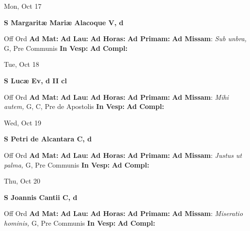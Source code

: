 \documentclass[10pt]{article}
\begin{document}
\begin{minipage}{3.5in}
\vspace{2em}\begin{center}
Mon, Oct 17
\end{center}\textbf{ \large S Margaritæ Mariæ Alacoque V, \textnormal{\normalsize d}}
\begin{justify}
Off Ord
\textbf{Ad Mat: }
\textbf{Ad Lau: }
\textbf{Ad Horas: }
\textbf{Ad Primam: }
\textbf{Ad Missam}: \textit{Sub unbra,} G, Pre Communis
\textbf{In Vesp: }
\textbf{Ad Compl: }\end{justify}
\end{minipage}



\begin{minipage}{3.5in}
\vspace{2em}\begin{center}
Tue, Oct 18
\end{center}\textbf{ \large S Lucæ Ev, \textnormal{\normalsize d II cl}}
\begin{justify}
Off Ord
\textbf{Ad Mat: }
\textbf{Ad Lau: }
\textbf{Ad Horas: }
\textbf{Ad Primam: }
\textbf{Ad Missam}: \textit{Mihi autem,} G, C, Pre de Apostolis
\textbf{In Vesp: }
\textbf{Ad Compl: }\end{justify}
\end{minipage}



\begin{minipage}{3.5in}
\vspace{2em}\begin{center}
Wed, Oct 19
\end{center}\textbf{ \large S Petri de Alcantara C, \textnormal{\normalsize d}}
\begin{justify}
Off Ord
\textbf{Ad Mat: }
\textbf{Ad Lau: }
\textbf{Ad Horas: }
\textbf{Ad Primam: }
\textbf{Ad Missam}: \textit{Justus ut palma,} G, Pre Communis
\textbf{In Vesp: }
\textbf{Ad Compl: }\end{justify}
\end{minipage}



\begin{minipage}{3.5in}
\vspace{2em}\begin{center}
Thu, Oct 20
\end{center}\textbf{ \large S Joannis Cantii C, \textnormal{\normalsize d}}
\begin{justify}
Off Ord
\textbf{Ad Mat: }
\textbf{Ad Lau: }
\textbf{Ad Horas: }
\textbf{Ad Primam: }
\textbf{Ad Missam}: \textit{Miseratio hominis,} G, Pre Communis
\textbf{In Vesp: }
\textbf{Ad Compl: }\end{justify}
\end{minipage}
\end{document}
